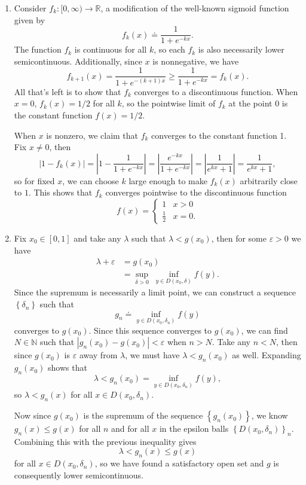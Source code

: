 \documentclass[10pt]{amsart}
\begin{document}
\begin{enumerate}
	\item Consider $f_k : [0,\infty) \to \mathbb{R}$, a modification of the well-known sigmoid function given by
			\[
				f_k(x) \doteq \frac{1}{1+e^{-kx}}.
			\] 
			The function $f_k$ is continuous for all $ k$, so each $f_k$ is also necessarily lower semicontinuous. Additionally, since $x$ is nonnegative, we have
			\[
				f_{k+1}(x) = \frac{1}{1+e^{-(k+1)x}} \geq \frac{1}{1+e^{-kx}} = f_k(x).
			\] All that's left is to show that $f_k$ converges to a discontinuous function. When $x=0$, $f_k(x) = 1/2$ for all $k$, so the pointwise limit of $f_k$ at the point  0 is the constant function $f(x) = 1/2$.

			When $x$ is nonzero, we claim that $f_k$ converges to the constant function 1. Fix $x \neq 0$, then
			\[
				\left| 1 - f_k(x) \right| = \left| 1 - \frac{1}{1+e^{-kx}}  \right| = \left| \frac{e^{-kx}}{1+e^{-kx}}  \right| = \left| \frac{1}{e^{kx}+1}  \right| = \frac{1}{e^{kx}+1} ,
		\] so for fixed $x$, we can choose $k$ large enough to make $f_k(x)$ arbitrarily close to $1$. This shows that $f_k$ converges pointwise to the discontinuous function
		\[
			f(x) =
			\begin{cases}
				1 & x>0 \\
				\frac{1}{2} & x=0.
			\end{cases}
		\] 

		\item Fix $x_0 \in [0,1]$ and take any $\lambda$ such that $\lambda < g(x_0)$, then for some $\varepsilon>0$ we have
			\begin{align*}
				\lambda+\varepsilon &= g(x_0) \\
						    &= \sup_{\delta>0}\;\inf_{y\in D(x_0,\delta)} f(y).
			\end{align*}
			Since the supremum is necessarily a limit point, we can construct a sequence $\left\{ \delta_n \right\}$ such that
			\[
				g_n \doteq \inf_{y\in D(x_0,\delta_n)} f(y)
			\] converges to $g(x_0)$. Since this sequence converges to $g(x_0)$, we can find $N \in \mathbb{N}$ such that $|g_n(x_0) - g(x_0)| < \varepsilon$ when $n > N$. Take any $n < N$, then since $g(x_0)$ is $\varepsilon$ away from $\lambda$, we must have $\lambda < g_n(x_0)$ as well. Expanding $g_n(x_0)$ shows that
			\[
				\lambda < g_n(x_0) = \inf_{y \in D(x_0,\delta_n)} f(y),
			\] so $\lambda < g_n(x)$ for all $x \in D(x_0,\delta_n)$.

			Now since $g(x_0)$ is the supremum of the sequence $\left\{ g_n(x_0) \right\}$, we know $g_n(x) \leq g(x)$ for all $n$ and for all $x$ in the epsilon balls $\left\{ D(x_0,\delta_n) \right\}_n$. Combining this with the previous inequality gives
			\[
				\lambda < g_n(x) \leq g(x)
			\] for all $x \in D(x_0,\delta_n)$, so we have found a satisfactory open set and $g$ is consequently lower semicontinuous.

\end{enumerate}
\end{document}
